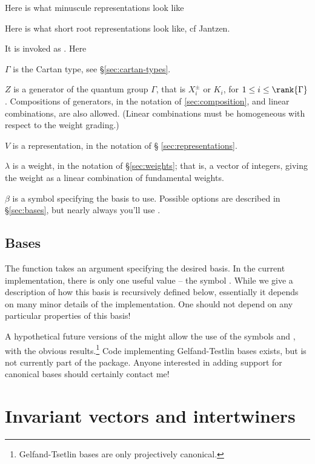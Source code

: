 Here is what minuscule representations look like

Here is what short root representations look like, cf Jantzen.

It is invoked as . Here
\begin{defn}
\item[$\Gamma$] is the Cartan type, see \S \ref{sec:cartan-types}.
\item[$Z$] is a generator of the quantum group $\Gamma$, that is
$X_i^\pm$ or $K_i$, for $1 \leq i \leq \rank{\Gamma}$. Compositions of
generators, in the notation of \ref{sec:composition}, and linear
combinations, are also allowed. (Linear combinations must be homogeneous
with respect to the weight grading.)
\item[$V$] is a representation, in the notation of \S
\ref{sec:representations}.
\item[$\lambda$] is a weight, in the notation of \S \ref{sec:weights};
that is, a vector of integers, giving the weight as a linear combination
of fundamental weights.
\item[$\beta$] is a symbol specifying the basis to use. Possible options are described in \S \ref{sec:bases}, but nearly always you'll use
.
\end{defn}

\subsection{Bases}
The function  takes an argument specifying the
desired basis. In the current implementation, there is only one useful
value -- the symbol . While we give a description
of how this basis is recursively defined below, essentially it depends on
many minor details of the implementation. One should not depend on any
particular properties of this basis!

A hypothetical future versions of the \pkg might allow the use of
the symbols  and , with
the obvious results.\footnote{Gelfand-Tsetlin bases are only projectively
canonical.} Code implementing Gelfand-Testlin bases exists, but is not
currently part of the package. Anyone interested in adding support for
canonical bases should certainly contact me!

\section{Invariant vectors and intertwiners}

